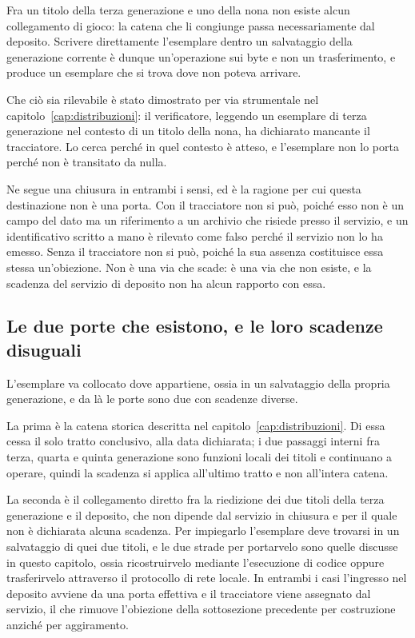 Fra un titolo della terza generazione e uno della nona non esiste alcun collegamento di gioco: la catena che li congiunge passa necessariamente dal deposito. Scrivere direttamente l'esemplare dentro un salvataggio della generazione corrente è dunque un'operazione sui byte e non un trasferimento, e produce un esemplare che si trova dove non poteva arrivare.

Che ciò sia rilevabile è stato dimostrato per via strumentale nel capitolo~\ref{cap:distribuzioni}: il verificatore, leggendo un esemplare di terza generazione nel contesto di un titolo della nona, ha dichiarato mancante il tracciatore. Lo cerca perché in quel contesto è atteso, e l'esemplare non lo porta perché non è transitato da nulla.

Ne segue una chiusura in entrambi i sensi, ed è la ragione per cui questa destinazione non è una porta. Con il tracciatore non si può, poiché esso non è un campo del dato ma un riferimento a un archivio che risiede presso il servizio, e un identificativo scritto a mano è rilevato come falso perché il servizio non lo ha emesso. Senza il tracciatore non si può, poiché la sua assenza costituisce essa stessa un'obiezione. Non è una via che scade: è una via che non esiste, e la scadenza del servizio di deposito non ha alcun rapporto con essa.

\subsection*{Le due porte che esistono, e le loro scadenze disuguali}

L'esemplare va collocato dove appartiene, ossia in un salvataggio della propria generazione, e da là le porte sono due con scadenze diverse.

La prima è la catena storica descritta nel capitolo~\ref{cap:distribuzioni}. Di essa cessa il solo tratto conclusivo, alla data dichiarata; i due passaggi interni fra terza, quarta e quinta generazione sono funzioni locali dei titoli e continuano a operare, quindi la scadenza si applica all'ultimo tratto e non all'intera catena.

La seconda è il collegamento diretto fra la riedizione dei due titoli della terza generazione e il deposito, che non dipende dal servizio in chiusura e per il quale non è dichiarata alcuna scadenza. Per impiegarlo l'esemplare deve trovarsi in un salvataggio di quei due titoli, e le due strade per portarvelo sono quelle discusse in questo capitolo, ossia ricostruirvelo mediante l'esecuzione di codice oppure trasferirvelo attraverso il protocollo di rete locale. In entrambi i casi l'ingresso nel deposito avviene da una porta effettiva e il tracciatore viene assegnato dal servizio, il che rimuove l'obiezione della sottosezione precedente per costruzione anziché per aggiramento.

